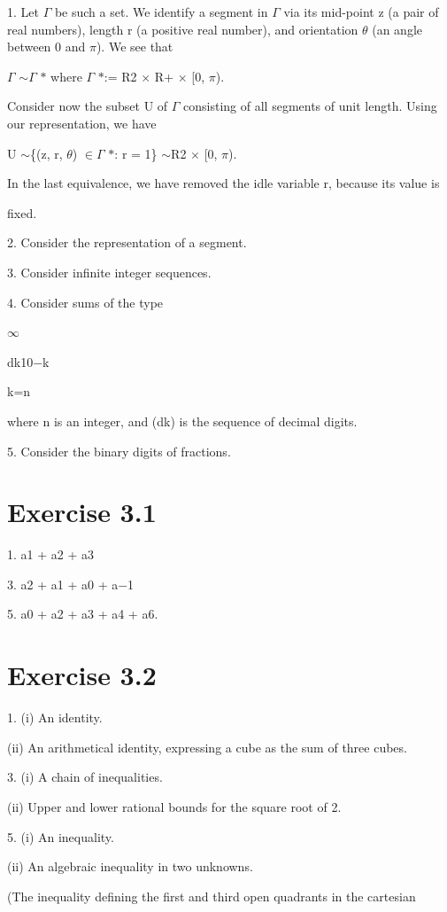 \documentclass[11pt]{article}
\theoremstyle{plain}
\theoremstyle{definition}
\begin{document}
1. Let $\Gamma$ be such a set. We identify a segment in $\Gamma$ via its mid-point z (a pair of real numbers), length r (a positive real number), and orientation $\theta$ (an angle between 0 and $\pi$). We see that

$\Gamma$ $\sim$$\Gamma$ $*$ where $\Gamma$ $*$:= R2 $\times$ R+ $\times$ [0, $\pi$).

Consider now the subset U of $\Gamma$ consisting of all segments of unit length. Using our representation, we have

U $\sim$\{(z, r, $\theta$) $\in$$\Gamma$ $*$: r = 1\} $\sim$R2 $\times$ [0, $\pi$).

In the last equivalence, we have removed the idle variable r, because its value is

fixed.

2. Consider the representation of a segment.

3. Consider infinite integer sequences.

4. Consider sums of the type

$\infty$

dk10$-$k

k=n

where n is an integer, and (dk) is the sequence of decimal digits.

5. Consider the binary digits of fractions.

\section{Exercise 3.1}

1. a1 + a2 + a3

3. a2 + a1 + a0 + a$-$1

5. a0 + a2 + a3 + a4 + a6.

\section{Exercise 3.2}

1. (i) An identity.

(ii) An arithmetical identity, expressing a cube as the sum of three cubes.

3. (i) A chain of inequalities.

(ii) Upper and lower rational bounds for the square root of 2.

5. (i) An inequality.

(ii) An algebraic inequality in two unknowns.

(The inequality defining the first and third open quadrants in the cartesian
\end{document}
